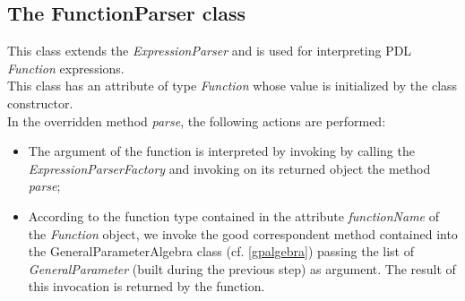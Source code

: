 \documentclass[a4paper,11pt] {ivoa}
\begin{document}
\subsection{The FunctionParser class}
This class extends the {\it ExpressionParser} and is used for interpreting PDL {\it Function} expressions.\\
This class has an attribute of type {\it Function} whose value is initialized by the class constructor.\\
In the overridden method {\it parse}, the following actions are performed:
\begin{itemize}
\item The argument of the function is interpreted by invoking by calling the {\it ExpressionParserFactory} and invoking on its returned object the method {\it parse};
\item According to the function type contained in the attribute {\it functionName} of the {\it Function} object, we invoke the good correspondent method contained into the {GeneralParameterAlgebra} class (cf. \ref{gpalgebra})  passing the list of {\it GeneralParameter} (built during the previous step) as argument. The result of this invocation is returned by the function.
\end{itemize}
\end{document}
